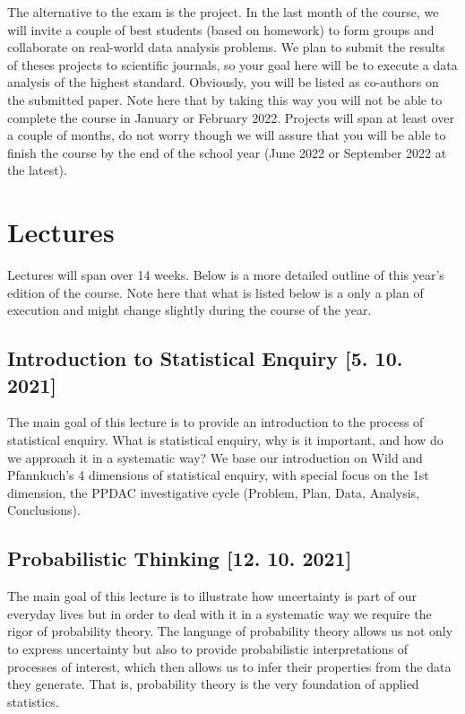 \documentclass[fleqn,moreauthors,10pt]{ds_report}
\begin{document}
The alternative to the exam is the project. In the last month of the course, we will invite a couple of best students (based on homework) to form groups and collaborate on real-world data analysis problems. We plan to submit the results of theses projects to scientific journals, so your goal here will be to execute a data analysis of the highest standard. Obviously, you will be listed as co-authors on the submitted paper. Note here that by taking this way you will not be able to complete the course in January or February 2022. Projects will span at least over a couple of months, do not worry though we will assure that you will be able to finish the course by the end of the school year (June 2022 or September 2022 at the latest).

\section*{Lectures}

Lectures will span over 14 weeks. Below is a more detailed outline of this year's edition of the course. Note here that what is listed below is a only a plan of execution and might change slightly during the course of the year.

\subsection*{Introduction to Statistical Enquiry [5. 10. 2021]}

The main goal of this lecture is to provide an introduction to the process of statistical enquiry. What is statistical enquiry, why is it important, and how do we approach it in a systematic way? We base our introduction on Wild and Pfannkuch’s 4 dimensions of statistical enquiry, with special focus on the 1st dimension, the PPDAC investigative cycle (Problem, Plan, Data, Analysis, Conclusions).

\subsection*{Probabilistic Thinking [12. 10. 2021]}

The main goal of this lecture is to illustrate how uncertainty is part of our everyday lives but in order to deal with it in a systematic way we require the rigor of probability theory. The language of probability theory allows us not only to express uncertainty but also to provide probabilistic interpretations of processes of interest, which then allows us to infer their properties from the data they generate. That is, probability theory is the very foundation of applied statistics.
\end{document}
